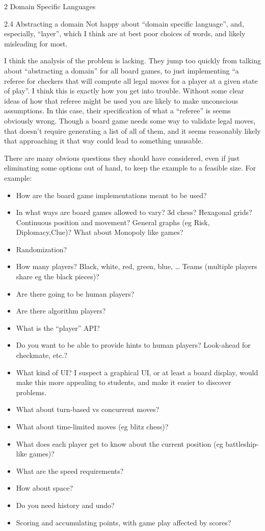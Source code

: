 \documentclass[12pt]{PalisadesLakesBook}
\begin{document}
\begin{plSection}{2 Domain Specific Languages}
\begin{plSection}{2.4 Abstracting a domain}
Not happy about ``domain specific language'',
and, especially, ``layer'',
which I think are at best poor choices of words,
and likely misleading for most.

I think the analysis of the problem is lacking.
They jump too quickly from talking about ``abstracting a domain''
for all board games, 
to just implementing 
``a referee for checkers that will compute all legal moves 
for a player at a given state of play''.
I think this is exactly how you get into trouble.
Without some clear ideas of how that referee might be used
you are likely to make unconscious assumptions.
In this case, their specification of what a ``referee'' is
seems obviously wrong.
Though a board game needs some way to validate legal moves, 
that doesn't require generating a list of all of them, 
and it seems reasonably likely that approaching it that way
could lead to something unusable. 

There are many obvious questions they should have considered,
even if just eliminating some options out of hand,
to keep the example to a feasible size.
For example:
\begin{itemize}
  \item How are the board game implementations meant to be used?
  \item In what ways are board games allowed to vary?
  3d chess? Hexagonal grids? Continuous position and movement?
  General graphs (eg Risk, Diplomacy,Clue)? 
  What about Monopoly like games?
  \item Randomization?
  \item How many players? 
  Black, white, red, green, blue, {\ldots}
  Teams (multiple players share eg the black pieces)?
  \item Are there going to be human players? 
  \item Are there algorithm players?
  \item What is the ``player'' API?
  \item Do you want to be able to provide hints to human players?
  Look-ahead for checkmate, etc.?
  \item What kind of UI?
  I suspect a graphical UI, or at least a board display,
  would make this more appealing to students, and make it easier
  to discover problems.
  \item What about turn-based vs concurrent moves?
  \item What about time-limited moves (eg blitz chess)?
  \item What does each player get to know about the current 
  position (eg battleship-like games)?
  \item What are the speed requirements?
  \item How about space? 
  \item Do you need history and undo?
  \item Scoring and accumulating points, with game play
  affected by scores? 
\end{itemize}


\end{plSection}
\end{plSection}
\end{document}
